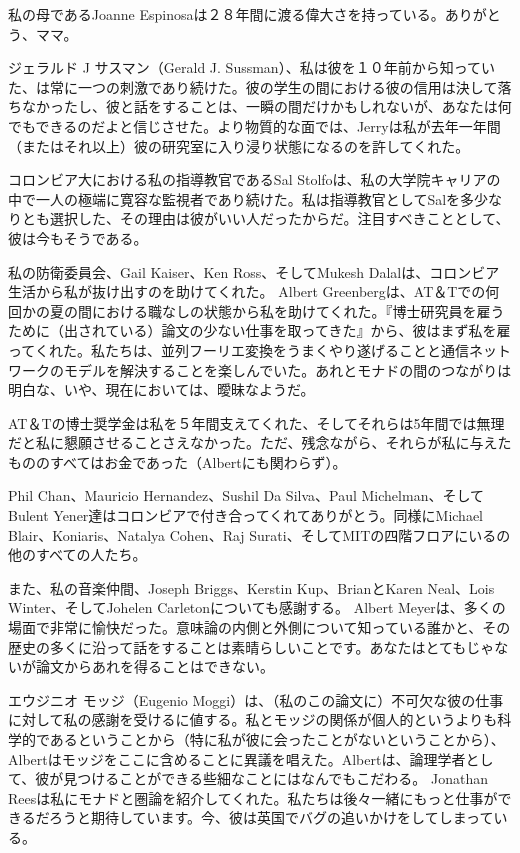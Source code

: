 \documentclass[11pt, oneside]{jsbook}   	%
\begin{document}
私の母であるJoanne Espinosaは２８年間に渡る偉大さを持っている。ありがとう、ママ。

ジェラルド J サスマン（Gerald J. Sussman）、私は彼を１０年前から知っていた、は常に一つの刺激であり続けた。彼の学生の間における彼の信用は決して落ちなかったし、彼と話をすることは、一瞬の間だけかもしれないが、あなたは何でもできるのだよと信じさせた。より物質的な面では、Jerryは私が去年一年間（またはそれ以上）彼の研究室に入り浸り状態になるのを許してくれた。

コロンビア大における私の指導教官であるSal Stolfoは、私の大学院キャリアの中で一人の極端に寛容な監視者であり続けた。私は指導教官としてSalを多少なりとも選択した、その理由は彼がいい人だったからだ。注目すべきこととして、彼は今もそうである。

私の防衛委員会、Gail Kaiser、Ken Ross、そしてMukesh Dalalは、コロンビア生活から私が抜け出すのを助けてくれた。
Albert Greenbergは、AT＆Tでの何回かの夏の間における職なしの状態から私を助けてくれた。『博士研究員を雇うために（出されている）論文の少ない仕事を取ってきた』から、彼はまず私を雇ってくれた。私たちは、並列フーリエ変換をうまくやり遂げることと通信ネットワークのモデルを解決することを楽しんでいた。あれとモナドの間のつながりは明白な、いや、現在においては、曖昧なようだ。

AT＆Tの博士奨学金は私を５年間支えてくれた、そしてそれらは5年間では無理だと私に懇願させることさえなかった。ただ、残念ながら、それらが私に与えたもののすべてはお金であった（Albertにも関わらず）。

Phil Chan、Mauricio Hernandez、Sushil Da Silva、Paul Michelman、そしてBulent Yener達はコロンビアで付き合ってくれてありがとう。同様にMichael Blair、Koniaris、Natalya Cohen、Raj Surati、そしてMITの四階フロアにいるの他のすべての人たち。

また、私の音楽仲間、Joseph Briggs、Kerstin Kup、BrianとKaren Neal、Lois Winter、そしてJohelen Carletonについても感謝する。
Albert Meyerは、多くの場面で非常に愉快だった。意味論の内側と外側について知っている誰かと、その歴史の多くに沿って話をすることは素晴らしいことです。あなたはとてもじゃないが論文からあれを得ることはできない。

エウジニオ モッジ（Eugenio Moggi）は、（私のこの論文に）不可欠な彼の仕事に対して私の感謝を受けるに値する。私とモッジの関係が個人的というよりも科学的であるということから（特に私が彼に会ったことがないということから）、Albertはモッジをここに含めることに異議を唱えた。Albertは、論理学者として、彼が見つけることができる些細なことにはなんでもこだわる。
\newpage
Jonathan Reesは私にモナドと圏論を紹介してくれた。私たちは後々一緒にもっと仕事ができるだろうと期待しています。今、彼は英国でバグの追いかけをしてしまっている。
\end{document}
